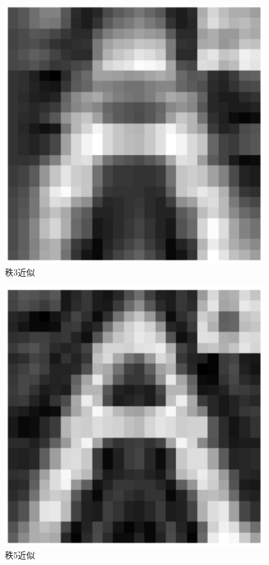 \documentclass[11pt,a4paper,twoside]{article}
\begin{document}
\begin{CJK}{UTF8}{gbsn}
\begin{figure}[htbp]%
  \centering
  \includegraphics[totalheight=2in]{./fig/7.jpg}
  \caption{秩3近似} 
  \label{fig:7}
\end{figure}

\begin{figure}[htbp]%
  \centering
  \includegraphics[totalheight=2in]{./fig/8.jpg}
  \caption{秩5近似} 
  \label{fig:8}
\end{figure}


\end{CJK}
\end{document}
